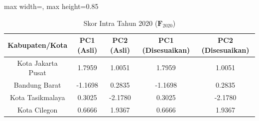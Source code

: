 \begin{table}[H]
\centering
\caption{Skor Intra Tahun 2020 ($\mathbf{F}_{2020}$)} \label{tab:sampleskor_intra_2020}
\begin{adjustbox}{max width=\textwidth, max height=0.85\textheight}
\begin{tabular}{|c|c|c|c|c|}
\hline
\textbf{Kabupaten/Kota} & \textbf{PC1 (Asli)} & \textbf{PC2 (Asli)} & \textbf{PC1 (Disesuaikan)} & \textbf{PC2 (Disesuaikan)} \\
\hline
Kota Jakarta Pusat & 1.7959 & 1.0051 & 1.7959 & 1.0051 \\
Bandung Barat & -1.1698 & 0.2835 & -1.1698 & 0.2835 \\
Kota Tasikmalaya & 0.3025 & -2.1780 & 0.3025 & -2.1780 \\
Kota Cilegon & 0.6666 & 1.9367 & 0.6666 & 1.9367 \\
\hline
\end{tabular}
\end{adjustbox}
\end{table}